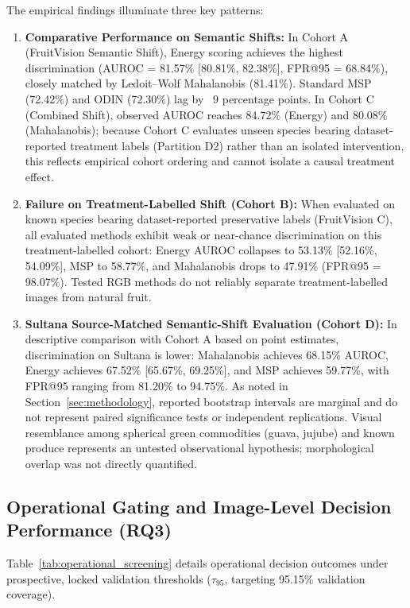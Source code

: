 \noindent The empirical findings illuminate three key patterns:
\begin{enumerate}
\setlength{\itemsep}{0pt}\setlength{\parsep}{0pt}\setlength{\parskip}{0pt}\setlength{\topsep}{1pt}\setlength{\partopsep}{0pt}
\item \textbf{Comparative Performance on Semantic Shifts:} In Cohort A (FruitVision Semantic Shift), Energy scoring achieves the highest discrimination (AUROC = 81.57\% [80.81\%, 82.38\%], FPR@95 = 68.84\%), closely matched by Ledoit--Wolf Mahalanobis (81.41\%). Standard MSP (72.42\%) and ODIN (72.30\%) lag by ~9 percentage points. In Cohort C (Combined Shift), observed AUROC reaches 84.72\% (Energy) and 80.08\% (Mahalanobis); because Cohort C evaluates unseen species bearing dataset-reported treatment labels (Partition D2) rather than an isolated intervention, this reflects empirical cohort ordering and cannot isolate a causal treatment effect.
\item \textbf{Failure on Treatment-Labelled Shift (Cohort B):} When evaluated on known species bearing dataset-reported preservative labels (FruitVision C), all evaluated methods exhibit weak or near-chance discrimination on this treatment-labelled cohort: Energy AUROC collapses to 53.13\% [52.16\%, 54.09\%], MSP to 58.77\%, and Mahalanobis drops to 47.91\% (FPR@95 = 98.07\%). Tested RGB methods do not reliably separate treatment-labelled images from natural fruit.
\item \textbf{Sultana Source-Matched Semantic-Shift Evaluation (Cohort D):} In descriptive comparison with Cohort A based on point estimates, discrimination on Sultana is lower: Mahalanobis achieves 68.15\% AUROC, Energy achieves 67.52\% [65.67\%, 69.25\%], and MSP achieves 59.77\%, with FPR@95 ranging from 81.20\% to 94.75\%. As noted in Section~\ref{sec:methodology}, reported bootstrap intervals are marginal and do not represent paired significance tests or independent replications. Visual resemblance among spherical green commodities (guava, jujube) and known produce represents an untested observational hypothesis; morphological overlap was not directly quantified.
\end{enumerate}

\subsection{Operational Gating and Image-Level Decision Performance (RQ3)}
Table~\ref{tab:operational_screening} details operational decision outcomes under prospective, locked validation thresholds ($\tau_{95}$, targeting 95.15\% validation coverage).

